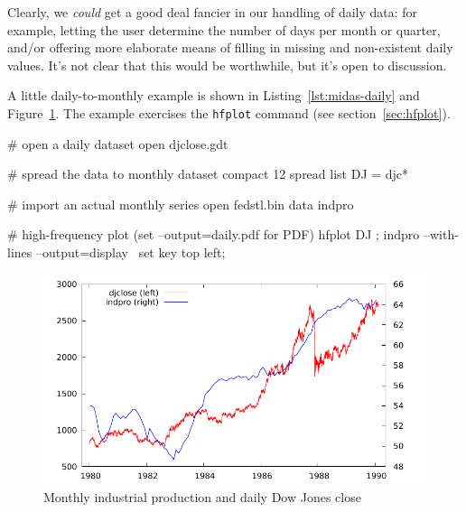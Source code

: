 Clearly, we \textit{could} get a good deal fancier in our handling of
daily data: for example, letting the user determine the number of days
per month or quarter, and/or offering more elaborate means of filling
in missing and non-existent daily values. It's not clear that this
would be worthwhile, but it's open to discussion.

A little daily-to-monthly example is shown in
Listing~\ref{lst:midas-daily} and Figure~\ref{fig:daily}. The example
exercises the \texttt{hfplot} command (see section~\ref{sec:hfplot}).

\begin{script}[htbp]
  \label{lst:midas-daily}
\begin{scode}
# open a daily dataset
open djclose.gdt

# spread the data to monthly
dataset compact 12 spread
list DJ = djc*

# import an actual monthly series
open fedstl.bin
data indpro

# high-frequency plot (set --output=daily.pdf for PDF)
hfplot DJ ; indpro --with-lines --output=display \
 {set key top left;}
\end{scode}
\end{script}

\begin{figure}[htbp]
  \centering
  \includegraphics{figures/midas_daily_plot}
  \caption{Monthly industrial production and daily Dow Jones close}
  \label{fig:daily}
\end{figure}

